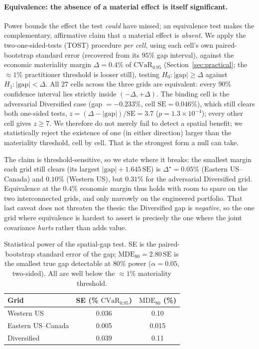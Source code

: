 \documentclass[10pt,twocolumn]{article}
\newcommand{\CVaR}{\mathrm{CVaR}}
\begin{document}
\paragraph{Equivalence: the absence of a material effect is itself significant.}
Power bounds the effect the test \emph{could} have missed; an equivalence test makes
the complementary, affirmative claim that a material effect is \emph{absent}. We
apply the two-one-sided-tests (TOST) procedure \citep{schuirmann1987,lakens2018}
\emph{per cell}, using each cell's own paired-bootstrap standard error (recovered
from its $95\%$ gap interval), against the economic materiality margin
$\Delta=0.4\%$ of $\CVaR_{0.95}$ (Section~\ref{sec:practical}; the $\approx1\%$
practitioner threshold is looser still), testing
$H_0\!:\lvert\text{gap}\rvert\ge\Delta$ against $H_1\!:\lvert\text{gap}\rvert<\Delta$.
All $27$ cells across the three grids are equivalent: every $90\%$ confidence
interval lies strictly inside $(-\Delta,+\Delta)$. The binding cell is the
adversarial Diversified case (gap $=-0.233\%$, cell $\mathrm{SE}=0.046\%$), which
still clears both one-sided tests, $z=(\Delta-\lvert\text{gap}\rvert)/\mathrm{SE}
=3.7$ ($p=1.3\times10^{-4}$); every other cell gives $z\ge7$. We therefore do not
merely fail to detect a spatial benefit; we statistically reject the existence of
one (in either direction) larger than the materiality threshold, cell by cell. That
is the strongest form a null can take.

The claim is threshold-sensitive, so we state where it breaks: the smallest margin
each grid still clears (its largest $\lvert\text{gap}\rvert+1.645\,\mathrm{SE}$) is
$\Delta^\star=0.05\%$ (Eastern US--Canada) and $0.10\%$ (Western US), but $0.31\%$ for
the adversarial Diversified grid. Equivalence at the $0.4\%$ economic margin thus holds
with room to spare on the two interconnected grids, and only narrowly on the engineered
portfolio. That last caveat does not threaten the thesis: the
Diversified gap is \emph{negative}, so the one grid where equivalence is hardest to
assert is precisely the one where the joint covariance \emph{hurts} rather than adds
value.

\begin{table}[h]
\centering\small
\caption{Statistical power of the spatial-gap test. SE is the paired-bootstrap
standard error of the gap; $\mathrm{MDE}_{80}=2.80\,\mathrm{SE}$ is the smallest
true gap detectable at $80\%$ power ($\alpha=0.05$, two-sided). All are well below
the $\approx1\%$ materiality threshold.}
\label{tab:power}
\begin{tabular}{lcc}
\toprule
Grid & SE (\% $\CVaR_{0.95}$) & $\mathrm{MDE}_{80}$ (\%)\\
\midrule
Western US        & 0.036 & 0.10\\
Eastern US--Canada & 0.005 & 0.015\\
Diversified       & 0.039 & 0.11\\
\bottomrule
\end{tabular}
\end{table}
\end{document}

